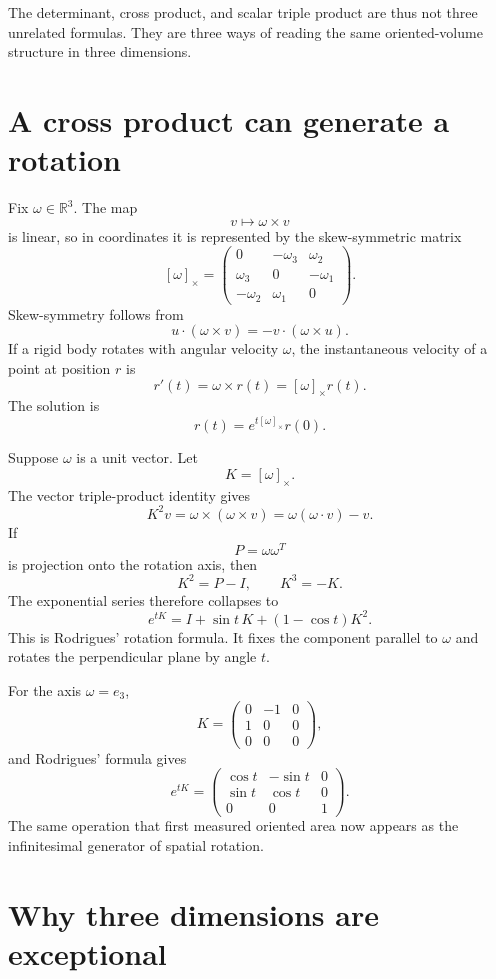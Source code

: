 The determinant, cross product, and scalar triple product are thus not three unrelated formulas.  They are three ways of reading the same oriented-volume structure in three dimensions.

\section{A cross product can generate a rotation}

Fix \(\omega\in\mathbb R^3\).  The map
\[
  v\longmapsto\omega\times v
\]
is linear, so in coordinates it is represented by the skew-symmetric matrix
\[
  [\omega]_\times=
  \begin{pmatrix}
    0&-\omega_3&\omega_2\\
    \omega_3&0&-\omega_1\\
    -\omega_2&\omega_1&0
  \end{pmatrix}.
\]
Skew-symmetry follows from
\[
  u\cdot(\omega\times v)
  =-v\cdot(\omega\times u).
\]
If a rigid body rotates with angular velocity \(\omega\), the instantaneous velocity of a point at position \(r\) is
\[
  r'(t)=\omega\times r(t)
  =[\omega]_\times r(t).
\]
The solution is
\[
  r(t)=e^{t[\omega]_\times}r(0).
\]

Suppose \(\omega\) is a unit vector.  Let
\[
  K=[\omega]_\times.
\]
The vector triple-product identity gives
\[
  K^2v=\omega\times(\omega\times v)
  =\omega(\omega\cdot v)-v.
\]
If
\[
  P=\omega\omega^T
\]
is projection onto the rotation axis, then
\[
  K^2=P-I,
  \qquad
  K^3=-K.
\]
The exponential series therefore collapses to
\[
  \boxed{
  e^{tK}=I+\sin t\,K+(1-\cos t)K^2.}
\]
This is Rodrigues' rotation formula.  It fixes the component parallel to \(\omega\) and rotates the perpendicular plane by angle \(t\).

For the axis \(\omega=e_3\),
\[
  K=
  \begin{pmatrix}
    0&-1&0\\
    1&0&0\\
    0&0&0
  \end{pmatrix},
\]
and Rodrigues' formula gives
\[
  e^{tK}=
  \begin{pmatrix}
    \cos t&-\sin t&0\\
    \sin t&\cos t&0\\
    0&0&1
  \end{pmatrix}.
\]
The same operation that first measured oriented area now appears as the infinitesimal generator of spatial rotation.

\section{Why three dimensions are exceptional}

